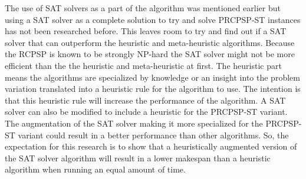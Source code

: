 The use of SAT solvers as a part of the algorithm was mentioned earlier but using a SAT solver as a complete solution to try and solve PRCPSP-ST instances has not been researched before. This leaves room to try and find out if a SAT solver that can outperform the heuristic and meta-heuristic algorithms. Because the RCPSP is known to be strongly NP-hard \cite{RN20} the SAT solver might not be more efficient than the the heuristic and meta-heuristic at first. The heuristic part means the algorithms are specialized by knowledge or an insight into the problem variation translated into a heuristic rule for the algorithm to use. The intention is that this heuristic rule will increase the performance of the algorithm. A SAT solver can also be modified to include a heuristic for the PRCPSP-ST variant. The augmentation of the SAT solver making it more specialized for the PRCPSP-ST variant could result in a better performance than other algorithms. So, the expectation for this research is to show that a heuristically augmented version of the SAT solver algorithm will result in a lower makespan than a heuristic algorithm when running an equal amount of time.

